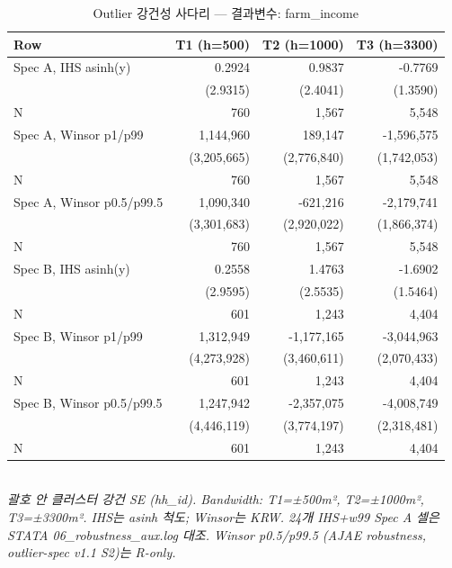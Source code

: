 \begin{table}[t]
\centering
\caption{Outlier 강건성 사다리 — 결과변수: farm_income}
\label{tab:rob_outlier_farm_income_ko}
\begin{tabular}{lrrr}
\toprule
Row & T1 (h=500) & T2 (h=1000) & T3 (h=3300) \\
\midrule
Spec A, IHS asinh(y) & 0.2924 & 0.9837 & -0.7769 \\
        & (2.9315) & (2.4041) & (1.3590) \\
N       & 760 & 1,567 & 5,548 \\
Spec A, Winsor p1/p99 & 1,144,960 & 189,147 & -1,596,575 \\
        & (3,205,665) & (2,776,840) & (1,742,053) \\
N       & 760 & 1,567 & 5,548 \\
Spec A, Winsor p0.5/p99.5 & 1,090,340 & -621,216 & -2,179,741 \\
        & (3,301,683) & (2,920,022) & (1,866,374) \\
N       & 760 & 1,567 & 5,548 \\
Spec B, IHS asinh(y) & 0.2558 & 1.4763 & -1.6902 \\
        & (2.9595) & (2.5535) & (1.5464) \\
N       & 601 & 1,243 & 4,404 \\
Spec B, Winsor p1/p99 & 1,312,949 & -1,177,165 & -3,044,963 \\
        & (4,273,928) & (3,460,611) & (2,070,433) \\
N       & 601 & 1,243 & 4,404 \\
Spec B, Winsor p0.5/p99.5 & 1,247,942 & -2,357,075 & -4,008,749 \\
        & (4,446,119) & (3,774,197) & (2,318,481) \\
N       & 601 & 1,243 & 4,404 \\
\bottomrule
\end{tabular}
\\
\footnotesize\textit{괄호 안 클러스터 강건 SE (hh_id). Bandwidth: T1=±500m², T2=±1000m², T3=±3300m². IHS는 asinh 척도; Winsor는 KRW. 24개 IHS+w99 Spec A 셀은 STATA 06_robustness_aux.log 대조. Winsor p0.5/p99.5 (AJAE robustness, outlier-spec v1.1 S2)는 R-only.}
\end{table}


